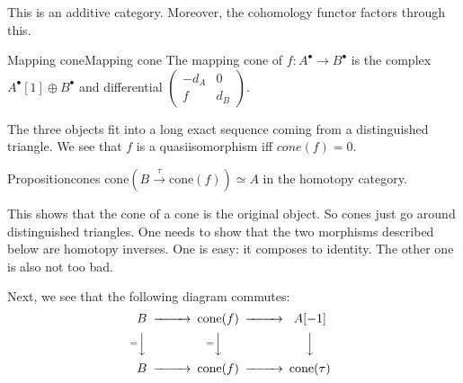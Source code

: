 This is an additive category. Moreover, the cohomology functor factors through this.

\begin{definition}{Mapping cone}{Mapping cone}
    The mapping cone of $f:A^\bullet\xrightarrow{}B^\bullet$ is the complex $A^\bullet[1]\oplus B^\bullet$ and differential $\begin{pmatrix} -d_A & 0 \\ f & d_B
\end{pmatrix}$.\end{definition}

The three objects fit into a long exact sequence coming from a distinguished triangle. We see that $f$ is a quasiisomorphism iff $cone(f)=0$. 

\begin{proposition}{Proposition}{cones}
    $\mathrm{cone}(B\xrightarrow{\tau} \mathrm{cone}(f))\simeq A$ in the homotopy category.
\end{proposition}

This shows that the cone of a cone is the original object. So cones just go around distinguished triangles. One needs to show that the two morphisms described below are homotopy inverses. One is easy: it composes to identity. The other one is also not too bad.


Next, we see that the following diagram commutes:$$\begin{CD} B @> > > \mathrm{cone}(f)@> > > A[-1] \\ @V=VV @V=VV @VVV\\B @> > > \mathrm{cone}(f) @> > > \mathrm{cone(\tau)}\end{CD}$$

